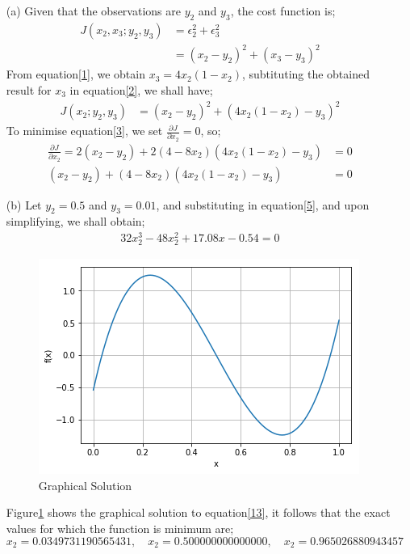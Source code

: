 \documentclass[12pt,a4paper]{article}
\begin{document}
\begin{itemize}
\item [(a)] 
Given that the observations are $y_{2}$ and $y_{3}$, the cost function is;
\begin{align}
J(x_{2},x_{3};y_{2},y_{3})&=\epsilon_{2}^{2}+\epsilon_{3}^{2}\\
&=\left(x_{2}-y_{2}\right)^{2}+\left(x_{3}-y_{3}\right)^{2} \label{2}
\end{align}
From equation\ref{1}, we obtain $x_{3}=4x_{2}\left(1-x_{2}\right)$, subtituting the obtained result for $x_{3}$ in equation\ref{2}, we shall have;
	\begin{align}
	J(x_{2};y_{2},y_{3})&=\left(x_{2}-y_{2}\right)^{2}+\left(4x_{2}\left(1-x_{2}\right)-y_{3}\right)^{2} \label{3}
	\end{align}
	To minimise equation\ref{3}, we set $\frac{\partial J}{\partial x_{2}}=0$, so;
	\begin{align}
	\frac{\partial J}{\partial x_{2}}=2(x_{2}-y_{2})+2(4-8x_{2})\left(4x_{2}\left(1-x_{2}\right)-y_{3}\right)&=0\\
	(x_{2}-y_{2})+(4-8x_{2})\left(4x_{2}\left(1-x_{2}\right)-y_{3}\right)&=0	\label{5}
	\end{align}
	\newpage
	\item[(b)]Let $y_{2}=0.5$ and $y_{3}=0.01$, and substituting in equation\ref{5}, and upon simplifying, we shall obtain;
	\begin{align}
	32x_{2}^{3}-48x_{2}^{2}+17.08x-0.54 =0\label{13}
	\end{align}
	\begin{figure}[h!]
		\centering
		\includegraphics[scale=0.5]{index.png}
		\caption{Graphical Solution} \label{14}
	\end{figure}

Figure\ref{14} shows the graphical solution to equation\ref{13}, it follows that the exact values for which the function is minimum are; 
$$x_{2}=0.0349731190565431, \quad x_{2}=0.500000000000000, \quad x_{2}=0.965026880943457$$


\end{itemize}
\end{document}
